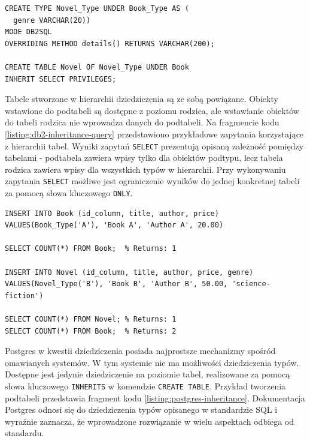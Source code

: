 \documentclass[a4paper,twoside,12pt]{book}
\begin{document}
\begin{lstlisting}[style=SQL, caption={Dziedziczenie typu i tabeli w IBM Db2.}, label={listing:db2-inheritance}, captionpos=b]
CREATE TYPE Novel_Type UNDER Book_Type AS (
  genre VARCHAR(20))
MODE DB2SQL
OVERRIDING METHOD details() RETURNS VARCHAR(200);

CREATE TABLE Novel OF Novel_Type UNDER Book
INHERIT SELECT PRIVILEGES;
\end{lstlisting}

Tabele stworzone w hierarchii dziedziczenia są ze sobą powiązane. Obiekty wstawione do podtabeli są dostępne z poziomu rodzica, ale wstawianie obiektów do tabeli rodzica nie wprowadza danych do podtabeli. Na fragmencie kodu \ref{listing:db2-inheritance-query} przedstawiono przykładowe zapytania korzystające z hierarchii tabel. Wyniki zapytań \lstinline{SELECT} prezentują opisaną zależność pomiędzy tabelami - podtabela zawiera wpisy tylko dla obiektów podtypu, lecz tabela rodzica zawiera wpisy dla wszystkich typów w hierarchii. Przy wykonywaniu zapytania \lstinline{SELECT} możliwe jest ograniczenie wyników do jednej konkretnej tabeli za pomocą słowa kluczowego \lstinline{ONLY}.

\begin{lstlisting}[style=SQL-with-inline-comments, caption={Zależności w hierarchii tabel w IBM Db2.}, label={listing:db2-inheritance-query}, captionpos=b]
INSERT INTO Book (id_column, title, author, price)
VALUES(Book_Type('A'), 'Book A', 'Author A', 20.00) 

SELECT COUNT(*) FROM Book;  % Returns: 1    

INSERT INTO Novel (id_column, title, author, price, genre)
VALUES(Novel_Type('B'), 'Book B', 'Author B', 50.00, 'science-fiction') 

SELECT COUNT(*) FROM Novel; % Returns: 1  
SELECT COUNT(*) FROM Book;  % Returns: 2      
\end{lstlisting}

Postgres w kwestii dziedziczenia posiada najprostsze mechanizmy spośród omawianych systemów. W tym systemie nie ma możliwości dziedziczenia typów. Dostępne jest jedynie dziedziczenie na poziomie tabel, realizowane za pomocą słowa kluczowego \lstinline{INHERITS} w komendzie \lstinline{CREATE TABLE}. Przykład tworzenia podtabeli przedstawia fragment kodu \ref{listing:postgres-inheritance}. Dokumentacja Postgres odnosi się do dziedziczenia typów opisanego w standardzie SQL i wyraźnie zaznacza, że wprowadzone rozwiązanie w wielu aspektach odbiega od standardu.
\end{document}
